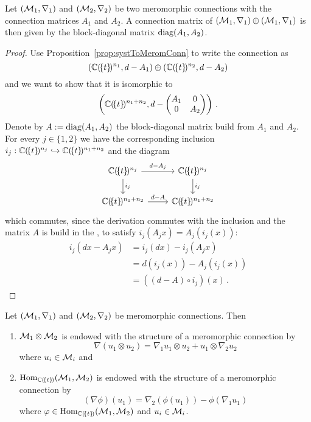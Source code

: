 \begin{prop}\label{prop:MatOfSumOfMerCon}
  Let $(\mathcal{M}_1,\nabla_1)$ and $(\mathcal{M}_2,\nabla_2)$ be two meromorphic
  connections
  with the connection matrices $A_1$ and $A_2$.
  A connection matrix of $(\mathcal{M}_1,\nabla_1)\oplus(\mathcal{M}_1,\nabla_1)$ is then
  given
  by the block-diagonal matrix $\operatorname{diag}(A_1,A_2)$.
\end{prop}
\begin{proof}
  Use Proposition~\ref{prop:systToMeromConn} to write the connection as
  \[
    (\mathbb{C}(\!\{t\}\!)^{n_1},d-A_1)\oplus(\mathbb{C}(\!\{t\}\!)^{n_2},d-A_2)
  \]
  and we want to show that it is isomorphic to
  \[
    \left(\mathbb{C}(\!\{t\}\!)^{n_1+n_2},d-
    \begin{pmatrix} A_1 & 0 \\0 & A_2 \end{pmatrix}\right) \,.
  \]
  Denote by $A:=\operatorname{diag}(A_1,A_2)$ the block-diagonal matrix build from $A_1$ and
  $A_2$.
  For every $j\in\{1,2\}$ we have the corresponding inclusion
  $i_j:\mathbb{C}(\!\{t\}\!)^{n_j}\hookrightarrow\mathbb{C}(\!\{t\}\!)^{n_1+n_2}$ and the
  diagram
  \[ \begin{tikzcd}
      \C(\!\{t\}\!)^{n_j} \rar{d-A_j}\dar{i_j} & \C(\!\{t\}\!)^{n_j} \dar{i_j}
    \\\C(\!\{t\}\!)^{n_1+n_2} \rar{d-A} & \C(\!\{t\}\!)^{n_1+n_2}
  \end{tikzcd} \]
  which commutes, since the derivation commutes with the inclusion and the
  matrix $A$ is build in the , to satisfy
  $i_j(A_jx)=A_j(i_j(x))$:
  \begin{align*}
    i_j(dx-A_jx) &= i_j(dx)-i_j(A_jx)
    \\&=d(i_j(x))-A_j(i_j(x))
    \\&=((d-A)\circ i_j)(x) \,.
  \end{align*}
\end{proof}

\begin{rem}
  Let $(\mathcal{M}_1,\nabla_1)$ and $(\mathcal{M}_2,\nabla_2)$ be meromorphic connections.
  Then
  \begin{enumerate}
    \item $\mathcal{M}_1\otimes\mathcal{M}_2$ is endowed with the structure of a meromorphic
      connection by
      \[
        \nabla(u_1\otimes u_2)=\nabla_1u_1\otimes u_2+u_1\otimes\nabla_2u_2
      \]
      where $u_i\in\mathcal{M}_i$ and
    \item $\operatorname{Hom}_{\mathbb{C}(\!\{t\}\!)}(\mathcal{M}_1,\mathcal{M}_2)$ is endowed with the structure of
      a meromorphic
      connection by
      \[
        (\nabla\phi)(u_1)=\nabla_2(\phi(u_1))-\phi(\nabla_1 u_1)
      \]
      where $\varphi\in\operatorname{Hom}_{\mathbb{C}(\!\{t\}\!)}(\mathcal{M}_1,\mathcal{M}_2)$ and $u_i\in\mathcal{M}_i$.
  \end{enumerate}
\end{rem}

